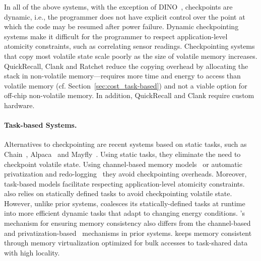In all of the above systems, with the exception of DINO~\cite{dino}, checkpoints are dynamic, i.e., the programmer does not have explicit control over the point at which the code may be resumed after power failure. Dynamic checkpointing systems make it difficult for the programmer to respect application-level atomicity constraints, such as correlating sensor readings. Checkpointing systems that copy most volatile state scale poorly as the size of volatile memory increases.  QuickRecall, Clank and Ratchet reduce the copying overhead by allocating the stack in non-volatile memory---requires more time and energy to access than volatile memory (cf. Section~\ref{sec:cost_task-based}) and not a viable option for off-chip non-volatile memory. In addition, QuickRecall and Clank require custom hardware. 

\paragraph{Task-based Systems.}
Alternatives to checkpointing are recent systems based on static tasks, such as Chain~\cite{chain}, Alpaca~\cite{alpaca} and Mayfly~\cite{hester_sensys_2017}. Using static tasks, they eliminate the need to checkpoint volatile state. Using channel-based memory models~\cite{chain,hester_sensys_2017} or automatic privatization and redo-logging~\cite{alpaca} they avoid checkpointing overheads. Moreover, task-based models facilitate respecting application-level atomicity constraints. \sys also relies on
statically defined tasks to avoid checkpointing volatile state. However, unlike prior systems, \sys coalesces its statically-defined tasks at runtime into more efficient dynamic tasks that adapt to changing energy conditions. \sys's mechanism for ensuring memory consistency also differs from the channel-based~\cite{chain} and privatization-based~\cite{alpaca} mechanisms in prior systems. \sys keeps memory consistent through memory virtualization optimized for bulk accesses to task-shared data with high locality.

